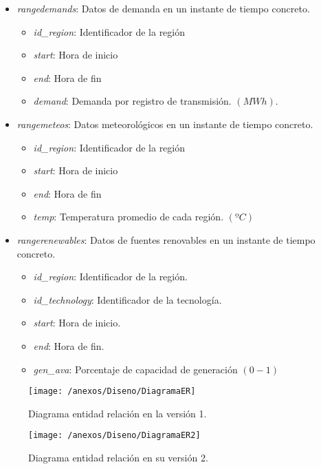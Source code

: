 \begin{itemize}
	\item \textit{rangedemands}: Datos de demanda en un instante de tiempo concreto.
	\begin{itemize}
		\item \textit{id\_region}: Identificador de la región
		\item \textit{start}: Hora de inicio
		\item \textit{end}: Hora de fin
		\item \textit{demand}: Demanda por registro de transmisión. $ (MWh) $.
	\end{itemize}
	
	\item \textit{rangemeteos}: Datos meteorológicos en un instante de tiempo concreto.
	\begin{itemize}
		\item \textit{id\_region}: Identificador de la región
		\item \textit{start}: Hora de inicio
		\item \textit{end}: Hora de fin
		\item \textit{temp}: Temperatura promedio de cada región. $ (ºC) $
	\end{itemize}
	
	\item \textit{rangerenewables}: Datos de fuentes renovables en un instante de tiempo concreto.
	\begin{itemize}
		\item \textit{id\_region}: Identificador de la región.
		\item \textit{id\_technology}: Identificador de la tecnología.
		\item \textit{start}: Hora de inicio.
		\item \textit{end}: Hora de fin.
		\item \textit{gen\_ava}: Porcentaje de capacidad de generación $ (0 - 1) $
	\end{itemize}

\end{itemize}

\begin{figure}[h]
	\centering
	\texttt{[image: /anexos/Diseno/DiagramaER]}
	\caption{Diagrama entidad relación en la versión 1.}
	\label{img:modeloER}
\end{figure}

\begin{figure}[h]
	\centering
	\texttt{[image: /anexos/Diseno/DiagramaER2]}
	\caption{Diagrama entidad relación en su versión 2.}
	\label{img:modeloER2}
\end{figure}

